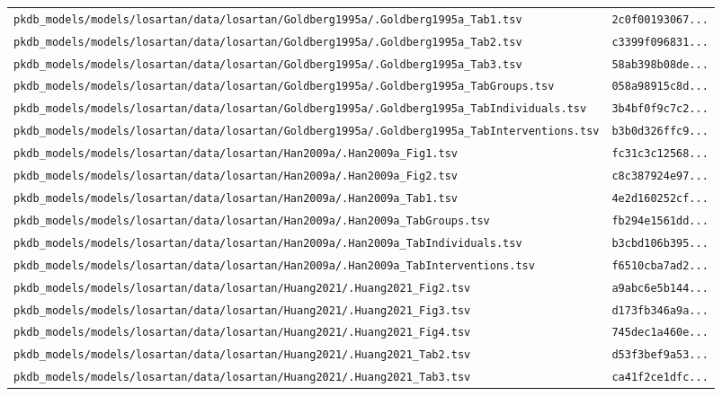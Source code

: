\documentclass{article}
\begin{document}
\begin{longtable}{ll}
\texttt{pkdb\_models/models/losartan/data/losartan/Goldberg1995a/.Goldberg1995a\_Tab1.tsv} & \texttt{2c0f00193067...} \\
\texttt{pkdb\_models/models/losartan/data/losartan/Goldberg1995a/.Goldberg1995a\_Tab2.tsv} & \texttt{c3399f096831...} \\
\texttt{pkdb\_models/models/losartan/data/losartan/Goldberg1995a/.Goldberg1995a\_Tab3.tsv} & \texttt{58ab398b08de...} \\
\texttt{pkdb\_models/models/losartan/data/losartan/Goldberg1995a/.Goldberg1995a\_TabGroups.tsv} & \texttt{058a98915c8d...} \\
\texttt{pkdb\_models/models/losartan/data/losartan/Goldberg1995a/.Goldberg1995a\_TabIndividuals.tsv} & \texttt{3b4bf0f9c7c2...} \\
\texttt{pkdb\_models/models/losartan/data/losartan/Goldberg1995a/.Goldberg1995a\_TabInterventions.tsv} & \texttt{b3b0d326ffc9...} \\
\texttt{pkdb\_models/models/losartan/data/losartan/Han2009a/.Han2009a\_Fig1.tsv} & \texttt{fc31c3c12568...} \\
\texttt{pkdb\_models/models/losartan/data/losartan/Han2009a/.Han2009a\_Fig2.tsv} & \texttt{c8c387924e97...} \\
\texttt{pkdb\_models/models/losartan/data/losartan/Han2009a/.Han2009a\_Tab1.tsv} & \texttt{4e2d160252cf...} \\
\texttt{pkdb\_models/models/losartan/data/losartan/Han2009a/.Han2009a\_TabGroups.tsv} & \texttt{fb294e1561dd...} \\
\texttt{pkdb\_models/models/losartan/data/losartan/Han2009a/.Han2009a\_TabIndividuals.tsv} & \texttt{b3cbd106b395...} \\
\texttt{pkdb\_models/models/losartan/data/losartan/Han2009a/.Han2009a\_TabInterventions.tsv} & \texttt{f6510cba7ad2...} \\
\texttt{pkdb\_models/models/losartan/data/losartan/Huang2021/.Huang2021\_Fig2.tsv} & \texttt{a9abc6e5b144...} \\
\texttt{pkdb\_models/models/losartan/data/losartan/Huang2021/.Huang2021\_Fig3.tsv} & \texttt{d173fb346a9a...} \\
\texttt{pkdb\_models/models/losartan/data/losartan/Huang2021/.Huang2021\_Fig4.tsv} & \texttt{745dec1a460e...} \\
\texttt{pkdb\_models/models/losartan/data/losartan/Huang2021/.Huang2021\_Tab2.tsv} & \texttt{d53f3bef9a53...} \\
\texttt{pkdb\_models/models/losartan/data/losartan/Huang2021/.Huang2021\_Tab3.tsv} & \texttt{ca41f2ce1dfc...} \\

\end{longtable}
\end{document}
